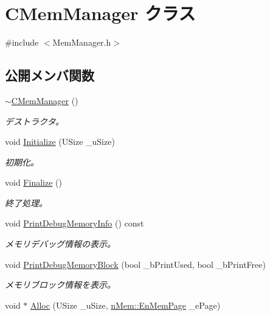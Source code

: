 \hypertarget{class_c_mem_manager}{}\section{C\+Mem\+Manager クラス}
\label{class_c_mem_manager}


{\ttfamily \#include $<$Mem\+Manager.\+h$>$}

\subsection*{公開メンバ関数}
\begin{DoxyCompactItemize}
\item 
\hyperlink{class_c_mem_manager_ae7e4b8312606aec77140bcdd0aae8429}{$\sim$\+C\+Mem\+Manager} ()
\begin{DoxyCompactList}\small\item\em デストラクタ。 \end{DoxyCompactList}\item 
void \hyperlink{class_c_mem_manager_a9fa68af354fb43cb27edda068139ecc5}{Initialize} (U\+Size \+\_\+u\+Size)
\begin{DoxyCompactList}\small\item\em 初期化。 \end{DoxyCompactList}\item 
void \hyperlink{class_c_mem_manager_aaf96237e163bbd903179b25057141710}{Finalize} ()
\begin{DoxyCompactList}\small\item\em 終了処理。 \end{DoxyCompactList}\item 
void \hyperlink{class_c_mem_manager_ae3ec85a949d2864a3d7b842674a4dd14}{Print\+Debug\+Memory\+Info} () const 
\begin{DoxyCompactList}\small\item\em メモリデバッグ情報の表示。 \end{DoxyCompactList}\item 
void \hyperlink{class_c_mem_manager_a44179f9ef3a73cc4ac56417309e4c087}{Print\+Debug\+Memory\+Block} (bool \+\_\+b\+Print\+Used, bool \+\_\+b\+Print\+Free)
\begin{DoxyCompactList}\small\item\em メモリブロック情報を表示。 \end{DoxyCompactList}\item 
void $\ast$ \hyperlink{class_c_mem_manager_a46ab3482dbf9e5139b20de3765741b61}{Alloc} (U\+Size \+\_\+u\+Size, \hyperlink{namespacen_mem_a44d64d91225ba6c957054d2db885dfbe}{n\+Mem\+::\+En\+Mem\+Page} \+\_\+e\+Page)

\end{DoxyCompactItemize}
